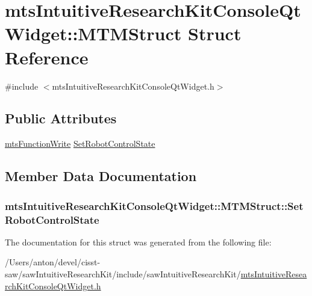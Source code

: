 \hypertarget{structmts_intuitive_research_kit_console_qt_widget_1_1_m_t_m_struct}{}\section{mts\+Intuitive\+Research\+Kit\+Console\+Qt\+Widget\+:\+:M\+T\+M\+Struct Struct Reference}
\label{structmts_intuitive_research_kit_console_qt_widget_1_1_m_t_m_struct}


{\ttfamily \#include $<$mts\+Intuitive\+Research\+Kit\+Console\+Qt\+Widget.\+h$>$}

\subsection*{Public Attributes}
\begin{DoxyCompactItemize}
\item 
\hyperlink{classmts_function_write}{mts\+Function\+Write} \hyperlink{structmts_intuitive_research_kit_console_qt_widget_1_1_m_t_m_struct_aca5725f72e8dc12b604e87381120883d}{Set\+Robot\+Control\+State}
\end{DoxyCompactItemize}


\subsection{Member Data Documentation}
\hypertarget{structmts_intuitive_research_kit_console_qt_widget_1_1_m_t_m_struct_aca5725f72e8dc12b604e87381120883d}{}
\subsubsection[{Set\+Robot\+Control\+State}]{ mts\+Intuitive\+Research\+Kit\+Console\+Qt\+Widget\+::\+M\+T\+M\+Struct\+::\+Set\+Robot\+Control\+State}\label{structmts_intuitive_research_kit_console_qt_widget_1_1_m_t_m_struct_aca5725f72e8dc12b604e87381120883d}


The documentation for this struct was generated from the following file\+:\begin{DoxyCompactItemize}
\item 
/\+Users/anton/devel/cisst-\/saw/saw\+Intuitive\+Research\+Kit/include/saw\+Intuitive\+Research\+Kit/\hyperlink{mts_intuitive_research_kit_console_qt_widget_8h}{mts\+Intuitive\+Research\+Kit\+Console\+Qt\+Widget.\+h}\end{DoxyCompactItemize}
